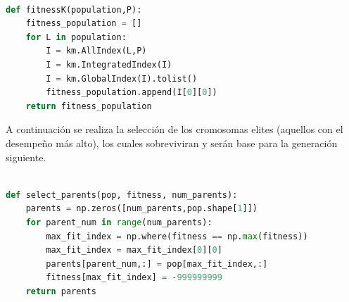 \begin{lstlisting}[frame=single,language = python]  % Start your code-block

def fitnessK(population,P):
    fitness_population = []
    for L in population:
        I = km.AllIndex(L,P)
        I = km.IntegratedIndex(I)
        I = km.GlobalIndex(I).tolist()
        fitness_population.append(I[0][0])
    return fitness_population
\end{lstlisting}

A continuación se realiza la selección de los cromosomas elites (aquellos con el desempeño más alto), los cuales sobreviviran y serán base para la generación siguiente.
~
\begin{lstlisting}[frame=single,language = python]  % Start your code-block

def select_parents(pop, fitness, num_parents):
    parents = np.zeros([num_parents,pop.shape[1]])
    for parent_num in range(num_parents):
        max_fit_index = np.where(fitness == np.max(fitness))
        max_fit_index = max_fit_index[0][0]
        parents[parent_num,:] = pop[max_fit_index,:]
        fitness[max_fit_index] = -999999999
    return parents
\end{lstlisting}

